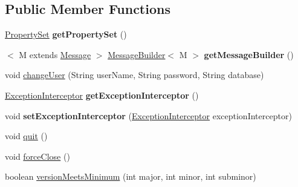 \subsection*{Public Member Functions}
\begin{DoxyCompactItemize}
\item 
\mbox{\label{interfacecom_1_1mysql_1_1cj_1_1_session_a76c18a20fdd1ad088a8053f236c57eb5}} 
\mbox{\hyperlink{interfacecom_1_1mysql_1_1cj_1_1conf_1_1_property_set}{Property\+Set}} {\bfseries get\+Property\+Set} ()
\item 
\mbox{\label{interfacecom_1_1mysql_1_1cj_1_1_session_ab2182c03050810ec8fa253a912c72e10}} 
$<$ M extends \mbox{\hyperlink{interfacecom_1_1mysql_1_1cj_1_1protocol_1_1_message}{Message}} $>$ \mbox{\hyperlink{interfacecom_1_1mysql_1_1cj_1_1_message_builder}{Message\+Builder}}$<$ M $>$ {\bfseries get\+Message\+Builder} ()
\item 
void \mbox{\hyperlink{interfacecom_1_1mysql_1_1cj_1_1_session_ae89407fa6e67fd4537f06c85f0a2695b}{change\+User}} (String user\+Name, String password, String database)
\item 
\mbox{\label{interfacecom_1_1mysql_1_1cj_1_1_session_a7e83fb6016b811e8bf9903c183a814ca}} 
\mbox{\hyperlink{interfacecom_1_1mysql_1_1cj_1_1exceptions_1_1_exception_interceptor}{Exception\+Interceptor}} {\bfseries get\+Exception\+Interceptor} ()
\item 
\mbox{\label{interfacecom_1_1mysql_1_1cj_1_1_session_ad05f11c98222964b8b57be538e65d805}} 
void {\bfseries set\+Exception\+Interceptor} (\mbox{\hyperlink{interfacecom_1_1mysql_1_1cj_1_1exceptions_1_1_exception_interceptor}{Exception\+Interceptor}} exception\+Interceptor)
\item 
void \mbox{\hyperlink{interfacecom_1_1mysql_1_1cj_1_1_session_af29d73c4e1343fb4bee53b0bac720108}{quit}} ()
\item 
void \mbox{\hyperlink{interfacecom_1_1mysql_1_1cj_1_1_session_a4394068e5b6e4534ae8d2d90ea4be2c6}{force\+Close}} ()
\item 
boolean \mbox{\hyperlink{interfacecom_1_1mysql_1_1cj_1_1_session_a480ce810135103101a0d39c5fbcd2ff0}{version\+Meets\+Minimum}} (int major, int minor, int subminor)
\item 

\end{DoxyCompactItemize}

